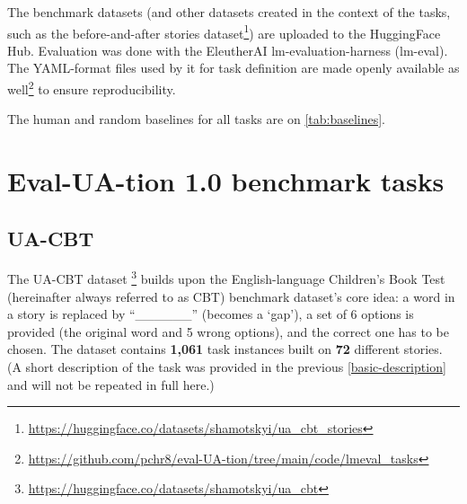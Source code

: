 The benchmark datasets (and other datasets created in the context of the tasks, such as the before-and-after stories dataset\footnote{
\href{https://huggingface.co/datasets/shamotskyi/ua_cbt_stories}{https://huggingface.co/datasets/shamotskyi/ua\_cbt\_stories}
}) are uploaded to the
HuggingFace Hub. 
Evaluation was done with the EleutherAI lm-evaluation-harness (lm-eval). The YAML-format files used by it for task definition are made openly available as well\footnote{\href{https://github.com/pchr8/eval-UA-tion/tree/main/code/lmeval_tasks/tasks}{https://github.com/pchr8/eval-UA-tion/tree/main/code/lmeval\_tasks}}
to ensure reproducibility. 

The human and random baselines for all tasks are on \autoref{tab:baselines}.




\section{Eval-UA-tion 1.0 benchmark tasks}\label{benchmark-tasks}
\subsection{UA-CBT}
\label{task:ua-cbt}

The UA-CBT dataset%
\footnote{\href{https://huggingface.co/datasets/shamotskyi/ua_cbt}{https://huggingface.co/datasets/shamotskyi/ua\_cbt}}
builds upon the English-language Children's Book Test (hereinafter always referred to as CBT) benchmark dataset's \citep{taskCBT} core idea: a word in a story is replaced by ``\_\_\_\_\_\_''
(becomes a `gap'), a set of 6 options is provided (the original word and 5 wrong options), and the correct one has to be chosen.
The dataset contains \textbf{1,061} task instances built on \textbf{72} different stories. 
(A short description of the task was provided in the previous \autoref{basic-description} and will not be repeated in full here.)

